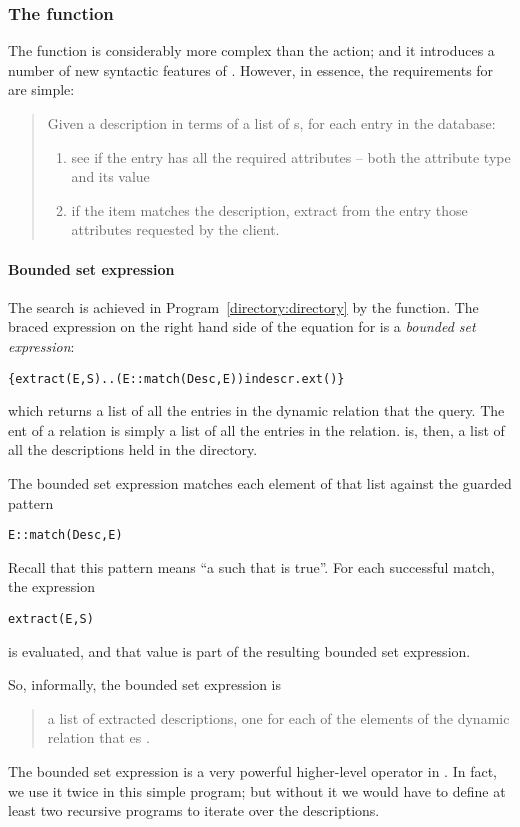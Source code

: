 \subsubsection{The  function}
The  function is considerably more complex than the  action; and it introduces a number of new syntactic features of \go. However, in essence, the requirements for  are simple:
\begin{quote}
Given a description in terms of a list of s, for each entry in the  database:
\begin{enumerate}
\item
see if the entry has all the required attributes -- both the attribute type and its value
\item
if the item matches the description, extract from the entry those attributes requested by the client.
\end{enumerate}
\end{quote}

\paragraph{Bounded set expression}
The search is achieved in Program~\ref{directory:directory} by the  function. The braced expression on the right hand side of the equation for  is a \emph{bounded set expression}:
\begin{alltt}
\{extract(E,S)..(E::match(Desc,E)) in descr.ext()\}
\end{alltt}
which returns a list of all the entries in the  dynamic relation that  the query. The ent of a  relation is simply a list of all the entries in the relation.  is, then, a list of all the descriptions held in the directory.

The bounded set expression matches each element of that list against the guarded pattern
\begin{alltt}
E::match(Desc,E)
\end{alltt}
Recall that this pattern means ``a  such that  is true''. For each successful match, the expression
\begin{alltt}
extract(E,S)
\end{alltt}
is evaluated, and that value is part of the resulting bounded set expression.

So, informally, the bounded set expression is
\begin{quote}
a list of extracted descriptions, one for each of the elements of the  dynamic relation that es .
\end{quote}
The bounded set expression is a very powerful higher-level operator in \go. In fact, we use it twice in this simple program; but without it we would have to define at least two recursive programs to iterate over the descriptions.

